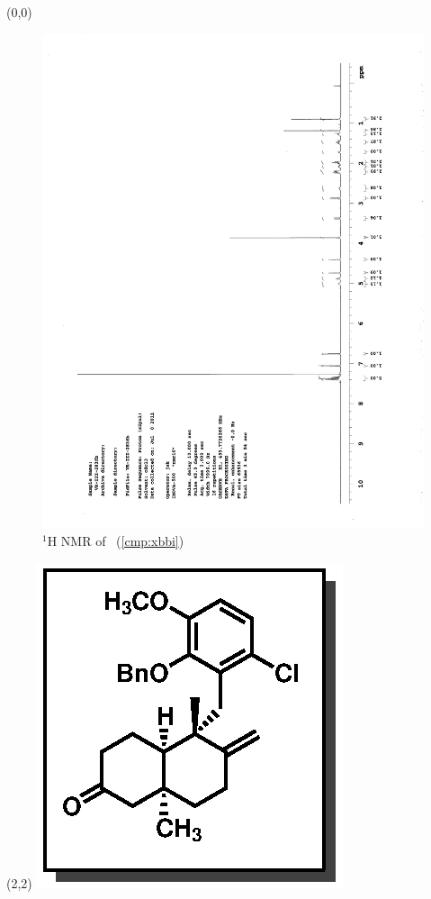 \begin{textblock}{20}(0,0)
\begin{figure}[htb]
\caption{$^1$H NMR of \CMPxbbi\ (\ref{cmp:xbbi})}
\includegraphics[scale=0.75, trim = 0mm 0mm 0mm 5mm,
clip]{chp_singlecarbon/images/nmr/xbbiH}
\vspace{-100pt}
\end{figure}
\end{textblock}
\begin{textblock}{1}(2,2)
\includegraphics[scale=0.8, angle=90]{chp_singlecarbon/images/xbbi}
\end{textblock}
